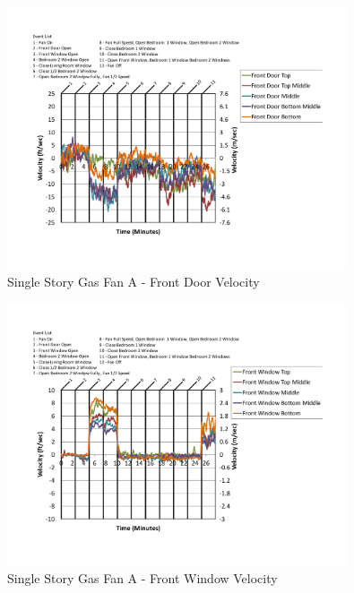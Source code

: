 \documentclass{article}
\begin{document}
\begin{appendices}
	\begin{figure}[H]
		\centering
		\includegraphics[height=3.05in,trim=0.67in 1.1in 0.67in 0.8in,clip=true]{0_Images/Results_Charts/ColdFlow/Single_Story/Gas/A/Front_Door_Velocity.pdf}
		\caption{Single Story Gas Fan A - Front Door Velocity}
	\end{figure}
 

	\begin{figure}[H]
		\centering
		\includegraphics[height=3.05in,trim=0.67in 1.1in 0.67in 0.8in,clip=true]{0_Images/Results_Charts/ColdFlow/Single_Story/Gas/A/Front_Window_Velocity.pdf}
		\caption{Single Story Gas Fan A - Front Window Velocity}
	\end{figure}
 
	\clearpage


\end{appendices}
\end{document}
